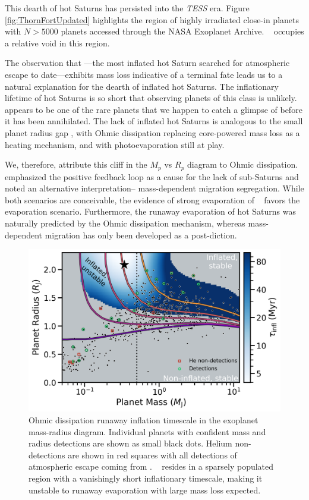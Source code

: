 \documentclass[twocolumn]{aastex631}
\newcommand{\hatpb}{\object{HAT-P-67 b}}
\begin{document}
This dearth of hot Saturns has persisted into the \emph{TESS} era.  Figure \ref{fig:ThornFortUpdated} highlights the region of highly irradiated close-in planets with $N>5000$ planets accessed through the NASA Exoplanet Archive.  \hatpb~ occupies a relative void in this region.

The observation that \hatpb---the most inflated hot Saturn searched for atmospheric escape to date---exhibits mass loss indicative of a terminal fate leads us to a natural explanation for the dearth of inflated hot Saturns.  The inflationary lifetime of hot Saturns is so short that observing planets of this class is unlikely.  \hatpb~ appears to be one of the rare planets that we happen to catch a glimpse of before it has been annihilated.  The lack of inflated hot Saturns is analogous to the small planet radius gap \citep{2017AJ....154..109F}, with Ohmic dissipation replacing core-powered mass loss as a heating mechanism, and with photoevaporation still at play.

We, therefore, attribute this cliff in the $M_p$ vs $R_p$ diagram to Ohmic dissipation.  \citet{2018AJ....155..214T} emphasized the positive feedback loop as a cause for the lack of sub-Saturns and noted an alternative interpretation-- mass-dependent migration segregation.  While both scenarios are conceivable, the evidence of strong evaporation of \hatpb~ favors the evaporation scenario.  Furthermore, the runaway evaporation of hot Saturns was naturally predicted by the Ohmic dissipation mechanism, whereas mass-dependent migration has only been developed as a post-diction.

\begin{figure}[t]
    \includegraphics[width=\linewidth]{figures/tf2018_fig2_theory.png}
    \caption{Ohmic dissipation runaway inflation timescale in the exoplanet mass-radius diagram.  Individual planets with confident mass and radius detections are shown as small black dots. Helium non-detections are shown in red squares with all detections of atmospheric escape coming from \citet{2022arXiv221116243D}.  \hatpb~ resides in a sparsely populated region with a vanishingly short inflationary timescale, making it unstable to runaway evaporation with large mass loss expected.}
    \label{fig:tf2018_theory}
\end{figure}
\end{document}
